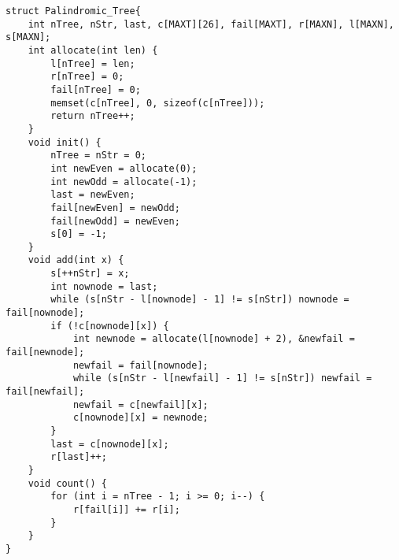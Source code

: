 \begin{lstlisting}
struct Palindromic_Tree{
	int nTree, nStr, last, c[MAXT][26], fail[MAXT], r[MAXN], l[MAXN], s[MAXN];
	int allocate(int len) {
		l[nTree] = len;
		r[nTree] = 0;
		fail[nTree] = 0;
		memset(c[nTree], 0, sizeof(c[nTree]));
		return nTree++;
	}
	void init() {
		nTree = nStr = 0;
		int newEven = allocate(0);
		int newOdd = allocate(-1);
		last = newEven;
		fail[newEven] = newOdd;
		fail[newOdd] = newEven;
		s[0] = -1;
	}
	void add(int x) {
		s[++nStr] = x;
		int nownode = last;
		while (s[nStr - l[nownode] - 1] != s[nStr]) nownode = fail[nownode];
		if (!c[nownode][x]) {
			int newnode = allocate(l[nownode] + 2), &newfail = fail[newnode];
			newfail = fail[nownode];
			while (s[nStr - l[newfail] - 1] != s[nStr]) newfail = fail[newfail];
			newfail = c[newfail][x];
			c[nownode][x] = newnode;
		}
		last = c[nownode][x];
		r[last]++;
	}
	void count() {
		for (int i = nTree - 1; i >= 0; i--) {
			r[fail[i]] += r[i];
		}
	}
}
\end{lstlisting}
